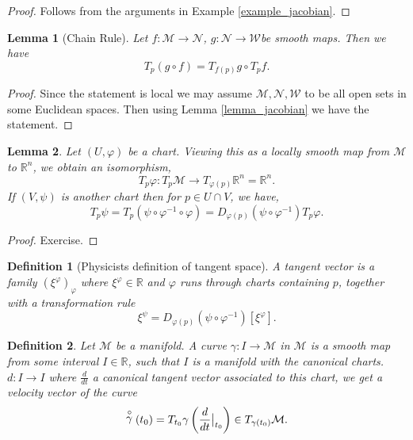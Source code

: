 \documentclass[8pt]{article}
\newtheorem{definition}{Definition}[section]
\newtheorem{lemma}{Lemma}[section]
\newcommand{\R}[0]{\mathbb{R}}
\newcommand{\M}[0]{\mathcal{M}}
\newcommand{\maniN}[0]{\mathcal{N}}
\begin{document}
\begin{proof}
  Follows from the arguments in Example \ref{example_jacobian}.
\end{proof}
\begin{lemma}[Chain Rule]
  Let $f:\M\to\mathcal{N}$, $g:\mathcal{N}\to\mathcal{W} $be smooth maps. Then we have 
  \begin{equation*}
    T_p(g\circ f) = T_{f(p)}g\circ T_pf.
  \end{equation*}
\end{lemma}
\begin{proof}
  Since the statement is local we may assume $\M,\maniN,\mathcal{W}$ to be all open sets in some Euclidean spaces. Then using Lemma \ref{lemma_jacobian} we have the statement.
\end{proof}
\begin{lemma}
  Let $(U,\varphi)$ be a chart. Viewing this as a locally smooth map from $\M$ to $\R^n$, we obtain an isomorphism,
  \begin{equation*}
    T_p\varphi:T_p\M\to T_{\varphi(p)}\R^n = \R^n.
  \end{equation*}
  If $(V,\psi)$ is another chart then for $p\in U\cap V$, we have,
  \begin{equation*}
    T_p\psi = T_p(\psi\circ\varphi^{-1}\circ \varphi) = D_{\varphi(p)}(\psi\circ\varphi^{-1})T_p\varphi.
  \end{equation*}
\end{lemma}
\begin{proof}
  Exercise.
\end{proof}

\begin{definition}[Physicists definition of tangent space]
  A tangent vector is a family $(\xi^\varphi)_\varphi$ where $\xi^\varphi\in\R$ 
  and $\varphi$ runs through charts containing $p$, together with a transformation rule 
  \begin{equation*}
    \xi^\psi = D_{\varphi(p)}\left(\psi\circ\varphi^{-1}\right)[\xi^\varphi].
  \end{equation*}

\end{definition}

\begin{definition}
  Let $\M$ be a manifold. A curve $\gamma:I\to \M$ in $\M$ is a smooth map from some interval $I\in\R$, such that $I$ is a manifold with the canonical charts. $d:I\to I$ where ${\frac d {dt}}$ a canonical tangent vector associated to this chart, we get a velocity vector of the curve 
  \begin{equation*}
    \stackrel{\circ}{\gamma}(t_0) = T_{t_0}\gamma\left({\frac d {dt}}\big{|}_{t_0}\right)\in T_{\gamma(t_0)}\M.
  \end{equation*}
\end{definition}
\end{document}
